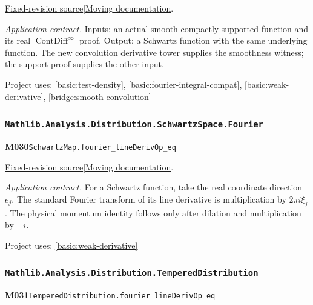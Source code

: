 \documentclass[11pt,a4paper]{article}
\theoremstyle{definition}
\theoremstyle{remark}
\begin{document}
\href{https://github.com/leanprover-community/mathlib4/blob/9bac2d0692944a775113f7c130fd5e5b4608a854/Mathlib/Analysis/Distribution/SchwartzSpace/Basic.lean}{Fixed-revision source}\quad|\quad\href{https://leanprover-community.github.io/mathlib4_docs/Mathlib/Analysis/Distribution/SchwartzSpace/Basic.html#HasCompactSupport.toSchwartzMap}{Moving documentation}.\par
\noindent\textit{Application contract.} Inputs: an actual smooth compactly supported function and its real $\operatorname{ContDiff}^{\infty}$ proof. Output: a Schwartz function with the same underlying function. The new convolution derivative tower supplies the smoothness witness; the support proof supplies the other input.\par
{\small Project uses: \ref{basic:test-density}, \ref{basic:fourier-integral-compat}, \ref{basic:weak-derivative}, \ref{bridge:smooth-convolution}}\par\medskip

\subsubsection*{\nolinkurl{Mathlib.Analysis.Distribution.SchwartzSpace.Fourier}}
\noindent\textbf{M030}\label{base:M030}\quad\nolinkurl{SchwartzMap.fourier_lineDerivOp_eq}

\href{https://github.com/leanprover-community/mathlib4/blob/9bac2d0692944a775113f7c130fd5e5b4608a854/Mathlib/Analysis/Distribution/SchwartzSpace/Fourier.lean}{Fixed-revision source}\quad|\quad\href{https://leanprover-community.github.io/mathlib4_docs/Mathlib/Analysis/Distribution/SchwartzSpace/Fourier.html#SchwartzMap.fourier_lineDerivOp_eq}{Moving documentation}.\par
\noindent\textit{Application contract.} For a Schwartz function, take the real coordinate direction $e_j$. The standard Fourier transform of its line derivative is multiplication by $2\pi i\xi_j$. The physical momentum identity follows only after dilation and multiplication by $-i$.\par
{\small Project uses: \ref{basic:weak-derivative}}\par\medskip

\subsubsection*{\nolinkurl{Mathlib.Analysis.Distribution.TemperedDistribution}}
\noindent\textbf{M031}\label{base:M031}\quad\nolinkurl{TemperedDistribution.fourier_lineDerivOp_eq}
\end{document}
